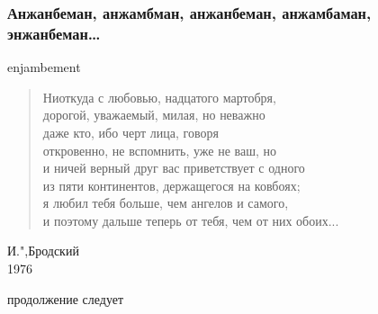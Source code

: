 \documentclass{beamer}
\begin{document}
%
\begin{frame}
\frametitle{Анжанбеман, анжамбман, анжанбеман, анжамбаман, энжанбеман\ldots}

enjambement

\begin{verse}
Ниоткуда с любовью, надцатого мартобря,\\
дорогой, уважаемый, милая, но \alert{неважно}\\
\alert{даже кто}, ибо черт лица, \alert{говоря}\\
\alert{откровенно}, не вспомнить, уже не ваш, \alert{но}\\
\alert{и ничей} верный друг вас приветствует \alert{с одного}\\
\alert{из пяти} континентов, держащегося на ковбоях;\\
я любил тебя больше, чем ангелов и самого,\\
и поэтому дальше теперь от тебя, чем от них обоих...
\end{verse}

И.",Бродский\\
1976

\end{frame}


\begin{frame}
\Huge{\centerline{продолжение следует}}
\end{frame}

\end{document}
